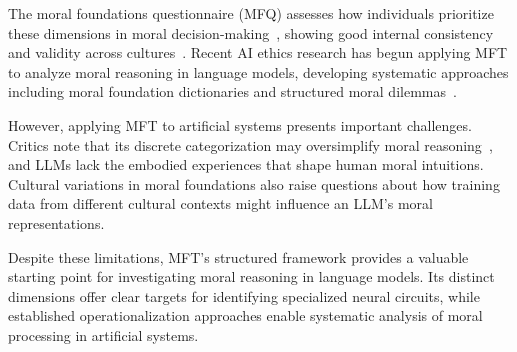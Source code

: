 \documentclass[runninghheads]{llncs}
\begin{document}
The moral foundations questionnaire (MFQ) assesses how individuals prioritize these dimensions in moral decision-making~\cite{Zhang2020}, showing good internal consistency and validity across cultures~\cite{Metayer2014,Davies2014Confirmatory}. Recent AI ethics research has begun applying MFT to analyze moral reasoning in language models, developing systematic approaches including moral foundation dictionaries and structured moral dilemmas~\cite{Hopp2021,Hendrycks2023,Brailsford2024,Nunes2024,Zangari2024}.

However, applying MFT to artificial systems presents important challenges. Critics note that its discrete categorization may oversimplify moral reasoning~\cite{Suhler2011}, and LLMs lack the embodied experiences that shape human moral intuitions. Cultural variations in moral foundations also raise questions about how training data from different cultural contexts might influence an LLM's moral representations.


Despite these limitations, MFT's structured framework provides a valuable starting point for investigating moral reasoning in language models. Its distinct dimensions offer clear targets for identifying specialized neural circuits, while established operationalization approaches enable systematic analysis of moral processing in artificial systems.
\end{document}
